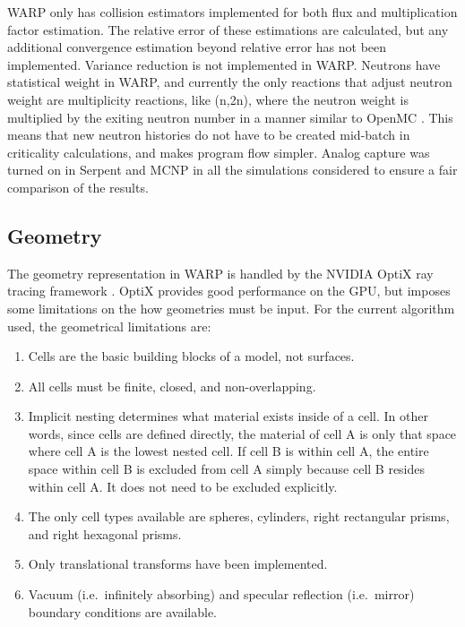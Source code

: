 \documentclass[preprint,12pt]{elsarticle}
\begin{document}
WARP only has collision estimators implemented for both flux and multiplication factor estimation.  The relative error of these estimations are calculated, but any additional convergence estimation beyond relative error has not been implemented.  Variance reduction is not implemented in WARP.  Neutrons have statistical weight in WARP, and currently the only reactions that adjust neutron weight are multiplicity reactions, like (n,2n), where the neutron weight is multiplied by the exiting neutron number in a manner similar to OpenMC \cite{openmc}.  This means that new neutron histories do not have to be created mid-batch in criticality calculations, and makes program flow simpler.  Analog capture was turned on in Serpent and MCNP in all the simulations considered to ensure a fair comparison of the results.  

\subsection{Geometry}

The geometry representation in WARP is handled by the NVIDIA OptiX ray tracing framework \cite{optix}.  OptiX provides good performance on the GPU, but imposes some limitations on the how geometries must be input.  For the current algorithm used, the geometrical limitations are:

\begin{enumerate}
\item Cells are the basic building blocks of a model, not surfaces.
\item All cells must be finite, closed, and non-overlapping.
\item Implicit nesting determines what material exists inside of a cell.  In other words, since cells are defined directly, the material of cell A is only that space where cell A is the lowest nested cell.  If cell B is within cell A, the entire space within cell B is excluded from cell A simply because cell B resides within cell A.  It does not need to be excluded explicitly.
\item The only cell types available are spheres, cylinders, right rectangular prisms, and right hexagonal prisms.
\item Only translational transforms have been implemented.
\item Vacuum (i.e.\ infinitely absorbing) and specular reflection  (i.e.\ mirror) boundary conditions are available.
\end{enumerate}
\end{document}
